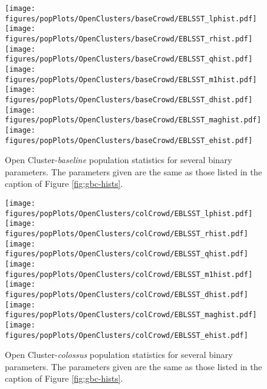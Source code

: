 \documentclass[twocolumn]{aastex63}
\begin{document}
\begin{figure*}[p]
    \centering
    \texttt{[image: figures/popPlots/OpenClusters/baseCrowd/EBLSST\_lphist.pdf]} 
    \texttt{[image: figures/popPlots/OpenClusters/baseCrowd/EBLSST\_rhist.pdf]} 
    \texttt{[image: figures/popPlots/OpenClusters/baseCrowd/EBLSST\_qhist.pdf]} 
    \texttt{[image: figures/popPlots/OpenClusters/baseCrowd/EBLSST\_m1hist.pdf]} 
    \texttt{[image: figures/popPlots/OpenClusters/baseCrowd/EBLSST\_dhist.pdf]}
    \texttt{[image: figures/popPlots/OpenClusters/baseCrowd/EBLSST\_maghist.pdf]} 
    \texttt{[image: figures/popPlots/OpenClusters/baseCrowd/EBLSST\_ehist.pdf]} 
    
    \caption{Open Cluster-\textit{baseline}  population statistics for several binary parameters. The parameters given are the same as those listed in the caption of Figure \ref{fig:gbc-hists}.}
    \label{fig:obc-hist}
\end{figure*}

\begin{figure*}[p]
    \centering
    \texttt{[image: figures/popPlots/OpenClusters/colCrowd/EBLSST\_lphist.pdf]}
    \texttt{[image: figures/popPlots/OpenClusters/colCrowd/EBLSST\_rhist.pdf]} 
    \texttt{[image: figures/popPlots/OpenClusters/colCrowd/EBLSST\_qhist.pdf]} 
    \texttt{[image: figures/popPlots/OpenClusters/colCrowd/EBLSST\_m1hist.pdf]} 
    \texttt{[image: figures/popPlots/OpenClusters/colCrowd/EBLSST\_dhist.pdf]}
    \texttt{[image: figures/popPlots/OpenClusters/colCrowd/EBLSST\_maghist.pdf]} 
    \texttt{[image: figures/popPlots/OpenClusters/colCrowd/EBLSST\_ehist.pdf]} 
    
    \caption{Open Cluster-\textit{colossus}  population statistics for several binary parameters. The parameters given are the same as those listed in the caption of Figure \ref{fig:gbc-hists}.} 
    \label{fig:occ-hists}
\end{figure*}
\end{document}
